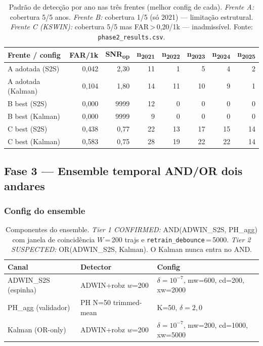\documentclass[11pt,a4paper]{article}
\begin{document}
\begin{table}[H]
\centering\small
\begin{tabular}{l r r r r r r r}
\toprule
\textbf{Frente / config} & \textbf{FAR/1k} & \textbf{SNR\textsubscript{op}} & \textbf{n\textsubscript{2021}} & \textbf{n\textsubscript{2022}} & \textbf{n\textsubscript{2023}} & \textbf{n\textsubscript{2024}} & \textbf{n\textsubscript{2025}} \\
\midrule
A adotada (S2S)    & 0{,}042 & 2{,}30 & 11 & 1 & 5 & 4 & 2 \\
A adotada (Kalman) & 0{,}104 & 1{,}80 & 14 & 11 & 10 & 9 & 1 \\
B best (S2S)       & 0{,}000 & 9999 & 12 & 0 & 0 & 0 & 0 \\
B best (Kalman)    & 0{,}000 & 9999 & 9 & 0 & 0 & 0 & 0 \\
C best (S2S)       & 0{,}438 & 0{,}77 & 22 & 13 & 17 & 15 & 14 \\
C best (Kalman)    & 0{,}583 & 0{,}75 & 28 & 19 & 22 & 22 & 14 \\
\bottomrule
\end{tabular}
\caption{Padr\~ao de detec\c{c}\~ao por ano nas tr\^es frentes (melhor
         config de cada). \emph{Frente A:} cobertura 5/5 anos.
         \emph{Frente B:} cobertura 1/5 (s\'o 2021) --- limita\c{c}\~ao
         estrutural. \emph{Frente C (KSWIN):} cobertura 5/5 mas
         FAR\,>\,0{,}20/1k --- inadmiss\'ivel. Fonte:
         \texttt{phase2\_results.csv}.}
\label{tab:m9_p2_byyear}
\end{table}

\subsection{Fase 3 --- Ensemble temporal AND/OR dois andares}

\subsubsection{Config do ensemble}

\begin{table}[H]
\centering\small
\begin{tabular}{l l l}
\toprule
\textbf{Canal} & \textbf{Detector} & \textbf{Config} \\
\midrule
ADWIN\_S2S (espinha) & ADWIN+robz $w$=200 & $\delta\!=\!10^{-7}$, mw=600, cd=200, xw=2000 \\
PH\_agg (validador)  & PH N=50 trimmed-mean & K=50, $\delta\!=\!2{,}0$ \\
Kalman (OR-only)     & ADWIN+robz $w$=200 & $\delta\!=\!10^{-7}$, mw=200, cd=1000, xw=5000 \\
\bottomrule
\end{tabular}
\caption{Componentes do ensemble. \emph{Tier 1 CONFIRMED:}
         AND(ADWIN\_S2S, PH\_agg) com janela de coincid\^encia
         $W$\,=\,200 trajs e \texttt{retrain\_debounce}\,=\,5000.
         \emph{Tier 2 SUSPECTED:} OR(ADWIN\_S2S, Kalman).
         O Kalman nunca entra no AND.}
\label{tab:m9_p3_config}
\end{table}
\end{document}
